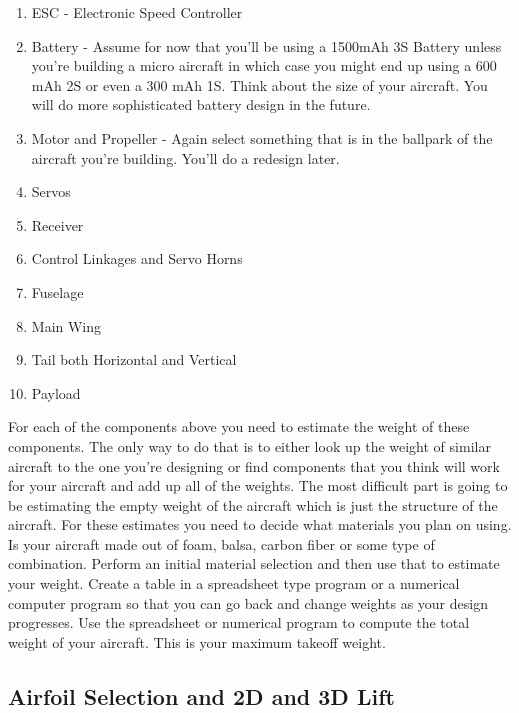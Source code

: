 \begin{enumerate}[itemsep=-5pt]
\item ESC - Electronic Speed Controller
\item Battery - Assume for now that you'll be using a 1500mAh 3S 
  Battery unless you're building a micro aircraft in which case you
  might end up using a 600 mAh 2S or even a 300 mAh 1S. Think about
  the size of your aircraft. You will do more sophisticated battery
  design in the future.
\item Motor and Propeller - Again select something that is in the
  ballpark of the aircraft you're building. You'll do a redesign later.
\item Servos
\item Receiver
\item Control Linkages and Servo Horns
\item Fuselage
\item Main Wing
\item Tail both Horizontal and Vertical
\item Payload
\end{enumerate}

For each of the components above you need to estimate the weight of
these components. The only way to do that is to either look up the
weight of similar aircraft to the one you're designing or find
components that you think will work for your aircraft and add up all
of the weights. The most difficult part is going to be estimating the
empty weight of the aircraft which is just the structure of the
aircraft. For these estimates you need to decide what materials you
plan on using. Is your aircraft made out of foam, balsa, carbon fiber
or some type of combination. Perform an initial material selection and
then use that to estimate your weight. Create a table in a spreadsheet
type program or a numerical computer program so that you can go back
and change weights as your design progresses. Use the spreadsheet or
numerical program to compute the total weight of your aircraft. This
is your maximum takeoff weight.

\subsection{Airfoil Selection and 2D and 3D Lift}

